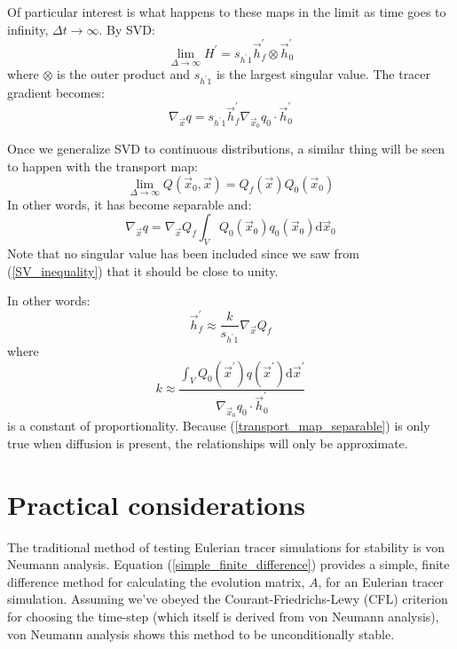\documentclass[11pt]{article}
\begin{document}
Of particular interest is what happens to these maps in the limit as time
goes to infinity, $\Delta t \rightarrow \infty$.
By SVD:
\begin{equation}
	\lim_{\Delta \rightarrow \infty} H^\prime = 
	s_{h^\prime1} \vec h_f^\prime \otimes \vec h_0^\prime
\end{equation}
where $\otimes$ is the outer product and $s_{h^\prime1}$ is the largest 
singular value. The tracer gradient becomes:
\begin{equation}
	\nabla_{\vec x} q = s_{h^\prime1} \vec h_f^\prime
	\nabla_{\vec x_0} q_0 \cdot \vec h_0^\prime
\end{equation}

Once we generalize SVD to continuous distributions, a similar thing will
be seen to happen with the transport map:
\begin{equation}
	\lim_{\Delta \rightarrow \infty} Q(\vec x_0, \vec x) =
	Q_f (\vec x) Q_0 (\vec x_0)
	\label{transport_map_separable}
\end{equation}
In other words, it has become separable and:
\begin{equation}
	\nabla_{\vec x} q = \nabla_{\vec x} Q_f \int_V Q_0 (\vec x_0) q_0 (\vec x_0) \mathrm d \vec x_0
\end{equation}
Note that no singular value has been included since we saw from
(\ref{SV_inequality}) that it should be close to unity.

In other words:
\begin{equation}
	\vec h_f^\prime \approx \frac{k}{s_{h^\prime1}} \nabla_{\vec x} Q_f
\end{equation}
where
\begin{equation}
	k \approx \frac{\int_V Q_0 (\vec x^\prime) q(\vec x^\prime) \mathrm d \vec x^\prime}
	{\nabla_{\vec x_0} q_0 \cdot \vec h_0^\prime}
\end{equation}
is a constant of proportionality.
Because (\ref{transport_map_separable}) is only true when diffusion is present,
the relationships will only be approximate.

\section{Practical considerations}

\label{practical_considerations}

The traditional method of testing Eulerian tracer simulations for stability
is von Neumann analysis.
Equation (\ref{simple_finite_difference}) provides a simple, finite
difference method for
calculating the evolution matrix, $A$, for an Eulerian tracer simulation.
Assuming we've obeyed the Courant-Friedrichs-Lewy (CFL) criterion for choosing
the time-step (which itself is derived from von Neumann analysis), von Neumann
analysis shows this method to be unconditionally stable.
\end{document}
